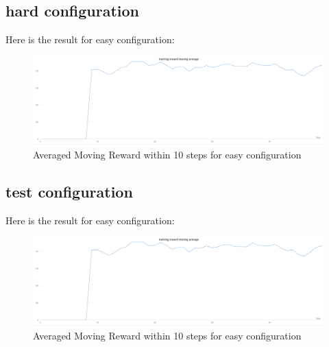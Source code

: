\documentclass{article}
\begin{document}
\subsection{hard configuration}
Here is the result for easy configuration: 
\begin{figure}[h]
\centering
\includegraphics[width=1\textwidth]{easy_config.png}
\caption{Averaged Moving Reward within 10 steps for easy configuration}    
\end{figure} 


\subsection{test configuration}
Here is the result for easy configuration: 
\begin{figure}[h]
\centering
\includegraphics[width=1\textwidth]{easy_config.png}
\caption{Averaged Moving Reward within 10 steps for easy configuration}    
\end{figure} 



  
  
\end{document}
